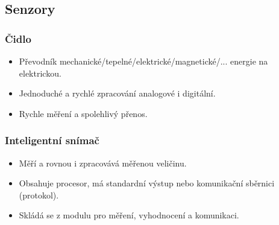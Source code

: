 \subsection{Senzory}

\subsubsection*{Čidlo}
\begin{itemize}
  \item Převodník mechanické/tepelné/elektrické/magnetické/... energie na elektrickou.
  \item Jednoduché a rychlé zpracování analogové i digitální.
  \item Rychle měření a spolehlivý přenos.
\end{itemize}

\subsubsection*{Inteligentní snímač}
\begin{itemize}
  \item Měří a rovnou i zpracovává měřenou veličinu.
  \item Obsahuje procesor, má standardní výstup nebo komunikační sběrnici (protokol).
  \item Skládá se z modulu pro měření, vyhodnocení a komunikaci.
\end{itemize}

